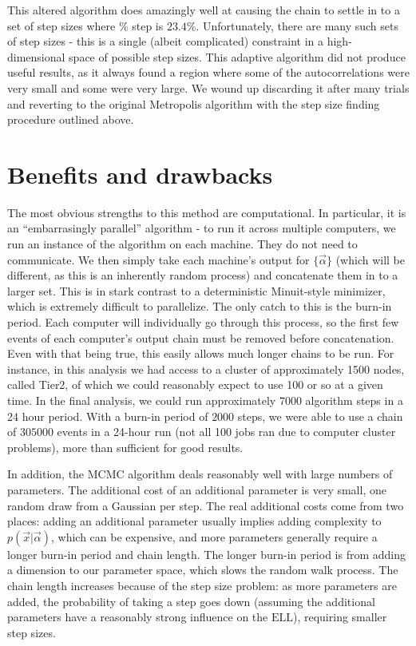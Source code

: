 This altered algorithm does amazingly well at causing the chain to
settle in to a set of step sizes where \% step is $23.4$\%.
Unfortunately, there are many such sets of step sizes - this is a
single (albeit complicated) constraint in a high-dimensional space of
possible step sizes.  This adaptive algorithm did not produce useful
results, as it always found a region where some of the
autocorrelations were very small and some were very large.  We wound
up discarding it after many trials and reverting to the original
Metropolis algorithm with the step size finding procedure outlined
above.

\section{Benefits and drawbacks}
The most obvious strengths to this method are computational.  In
particular, it is an ``embarrasingly parallel'' algorithm - to run it
across multiple computers, we run an instance of the algorithm on each
machine.  They do not need to communicate.  We then simply take each
machine's output for $\{\vec{\alpha}\}$ (which will be different, as
this is an inherently random process) and concatenate them in to a
larger set.  This is in stark contrast to a deterministic Minuit-style
minimizer, which is extremely difficult to parallelize.  The only
catch to this is the burn-in period.  Each computer will individually
go through this process, so the first few events of each computer's
output chain must be removed before concatenation.  Even with that
being true, this easily allows much longer chains to be run.  For
instance, in this analysis we had access to a cluster of approximately
1500 nodes, called Tier2, of which we could reasonably expect to use
100 or so at a given time.  In the final analysis, we could run
approximately $7000$ algorithm steps in a 24 hour period.  With a
burn-in period of $2000$ steps, we were able to use a chain of
$305000$ events in a 24-hour run (not all 100 jobs ran due to computer
cluster problems), more than sufficient for good results.

In addition, the MCMC algorithm deals reasonably well with large
numbers of parameters.  The additional cost of an additional parameter
is very small, one random draw from a Gaussian per step.  The real
additional costs come from two places: adding an additional parameter
usually implies adding complexity to $p(\vec{x}|\vec{\alpha})$, which
can be expensive, and more parameters generally require a longer
burn-in period and chain length.  The longer burn-in period is from
adding a dimension to our parameter space, which slows the random walk
process.  The chain length increases because of the step size problem:
as more parameters are added, the probability of taking a step goes
down (assuming the additional parameters have a reasonably strong
influence on the $\mathrm{ELL}$), requiring smaller step sizes.

